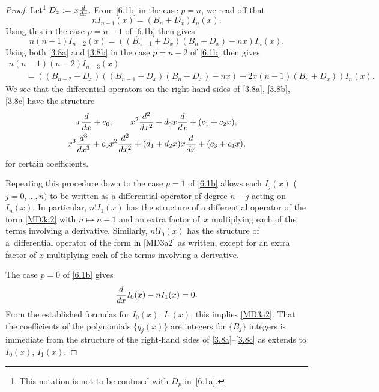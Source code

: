 \documentclass[10pt,a4paper]{amsart}
\begin{document}
 \begin{proof}
 Let\footnote{This notation is not to be confused with $D_p$ in~\eqref{6.1a}.} $D_x := x {{\rm d} \over{\rm d} x}$.
 From \eqref{6.1b} in the case $p=n$, we read off that
 \begin{equation}\label{3.8a}
 n I_{n-1}(x) = (B_n + D_x) I_{n}(x).
 \end{equation}
 Using this in the case $p=n-1$ of \eqref{6.1b} then gives
 \begin{equation}\label{3.8b}
 n ( n - 1 ) I_{n-2}(x) = ((B_{n-1} + D_x)
 (B_{n} + D_x) - n x )
 I_{n}(x).
 \end{equation}
 Using both \eqref{3.8a} and \eqref{3.8b} in the case $p=n-2$ of
\eqref{6.1b} then gives
 \begin{gather}
 n ( n - 1 )(n-2) I_{n-3}(x)\nonumber\\
 \qquad = ( (B_{n-2} + D_x) ((B_{n-1} + D_x)
 (B_{n} + D_x) - n x )
 -2 x (n-1) (B_{n} + D_x) )
 I_{n}(x).\label{3.8c}
 \end{gather}
 We see that the differential operators on the right-hand sides of \eqref{3.8a}, \eqref{3.8b}, \eqref{3.8c} have the structure
 \begin{gather*}%
 x {{\rm d} \over {\rm d}x} + c_0,\qquad
 x^2 {{\rm d}^2 \over {\rm d}x^2} + d_0 x {{\rm d} \over {\rm d}x}+
 (c_1 + c_2 x),\\
 x^3 {{\rm d}^3 \over {\rm d}x^3} + e_0 x^2 {{\rm d}^2 \over {\rm d}x^2}+
 (d_1 + d_2 x) x {{\rm d} \over {\rm d}x} +
 (c_3 + c_4x),
\end{gather*}
{for certain coefficients.}

Repeating this procedure down to the case $p=1$ of \eqref{6.1b} allows each $I_j(x)$ ($j=0,\dots,n)$ to be written as a differential operator of degree $n-j$ acting on $I_n(x)$. In particular,
$n! I_1(x)$ has the structure of a differential operator of the form \eqref{MD3a2} with $n \mapsto n - 1$ and an extra factor of~$x$ multiplying each of the terms involving a derivative. Similarly, $n! I_0(x)$ has the structure of a~differential operator of the form in
\eqref{MD3a2} as written, except for
an extra factor of $x$ multiplying each of the terms involving a derivative.

The case $p=0$ of \eqref{6.1b} gives
 \begin{equation}\label{op3a}
{{\rm d} \over{\rm d} x} I_0(x) - n I_1(x) = 0.
\end{equation}
From the established formulas for $I_0(x)$, $I_1(x)$, this implies \eqref{MD3a2}. That the coefficients of the polynomials $\{ q_j(x) \}$ are integers for $\{ B_j\}$ integers is immediate from the structure of the right-hand sides of
\eqref{3.8a}--\eqref{3.8c} as extends to $I_0(x)$, $I_1(x)$.
\end{proof}
\end{document}

